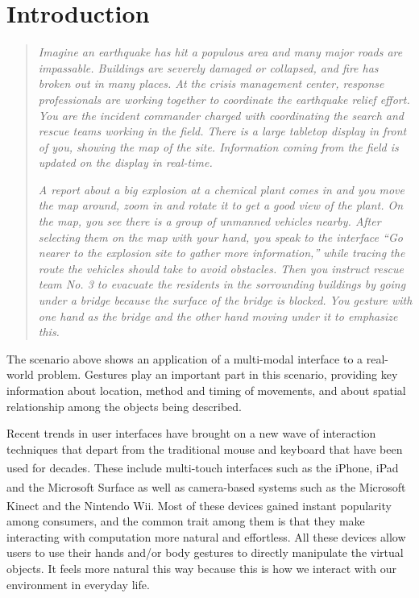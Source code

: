 \section{Introduction}
\begin{quotation}
\textit{Imagine an earthquake has hit a populous area and many major roads are
impassable. Buildings are severely damaged or collapsed, and fire has broken out
in many places. At the crisis management center, response professionals are
working together to coordinate the earthquake relief effort. You are the
incident commander charged with coordinating the search
and rescue teams working in the field. There is a large tabletop display in
front of you, showing the map of the site. Information coming from the field is
updated on the display in real-time.}

\textit{A report about a big explosion at a chemical plant comes in and you move
the map around, zoom in and rotate it to get a good view of the plant. On the
map, you see there is a group of unmanned vehicles nearby. After selecting them
on the map with your hand, you speak to the interface ``Go nearer to the
explosion site to gather more information,'' while tracing the route the
vehicles should take to avoid obstacles. Then you instruct rescue team No. 3 to evacuate the residents
in the sorrounding buildings by going under a bridge because the surface of the
bridge is blocked. You gesture with one hand as the bridge and the other
hand moving under it to emphasize this.}
\end{quotation}

The scenario above shows an application of a multi-modal interface to a
real-world problem. Gestures play an important part in this scenario,
providing key information about location, method and timing of movements,
and about spatial relationship among the objects being described.

Recent trends in user interfaces have brought on a new wave of interaction
techniques that depart from the traditional mouse and keyboard that have been 
used for decades. These include multi-touch interfaces such as the 
iPhone\textsuperscript{\textregistered}, iPad and the Microsoft 
Surface\textsuperscript{\textregistered} as well as camera-based systems such as
the Microsoft Kinect and the Nintendo\textsuperscript{\textregistered} Wii. Most
of these devices gained instant popularity among consumers, and the common trait
among them is that they make interacting with computation more natural and 
effortless. All these devices allow users to use their hands and/or body 
gestures to directly manipulate the virtual objects. It feels more natural this 
way because this is how we interact with our environment in everyday life.
 
